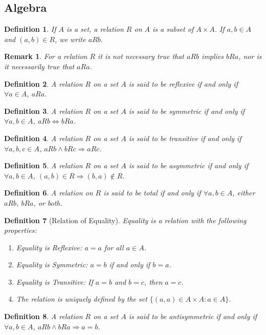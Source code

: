 \documentclass[crop=false,class=book]{standalone}
\theoremstyle{mystyle}
\newtheorem{definition}{Definition}[section]
\newtheorem{remark}{Remark}[section]
\begin{document}
\subsection{Algebra}
\begin{definition}
If $A$ is a set, a relation $R$ on $A$ is a subset of $A\times A$. If $a,b\in A$ and $(a,b)\in R$, we write $aR b$.
\end{definition}
\begin{remark}
For a relation $R$ it is not necessary true that $aRb$ implies $bRa$, nor is it necessarily true that $aRa$.
\end{remark}
\begin{definition}
A relation $R$ on a set $A$ is said to be reflexive if and only if $\forall a\in A$, $aRa$.
\end{definition}
\begin{definition}
A relation $R$ on a set $A$ is said to be symmetric if and only if $\forall a,b\in A$, $aRb\Leftrightarrow bRa$.
\end{definition}
\begin{definition}
A relation $R$ on a set $A$ is said to be transitive if and only if $\forall a,b,c\in A$, $aRb \land bRc \Rightarrow aRc$.
\end{definition}
\begin{definition}
A relation $R$ on a set $A$ is said to be asymmetric if and only if $\forall a,b\in A$, $(a,b)\in R\Rightarrow (b,a) \notin R$.
\end{definition}
\begin{definition}
A relation on $R$ is said to be total if and only if $\forall a,b \in A$, either $aRb$, $bRa$, or both.
\end{definition}
\begin{definition}[Relation of Equality]
Equality is a relation with the following properties:
\begin{enumerate}
\item Equality is Reflexive: $a=a$ for all $a\in A$.
\item Equality is Symmetric: $a=b$ if and only if $b=a$.
\item Equality is Transitive: If $a=b$ and $b=c$, then $a=c$.
\item The relation is uniquely defined by the set $\{(a,a)\in A\times A:a\in A\}$.
\end{enumerate}
\end{definition}
\begin{definition}
A relation $R$ on a set $A$ is said to be antisymmetric if and only if $\forall a,b \in A$, $aRb\land bRa\Rightarrow a=b$.
\end{definition}
\end{document}
